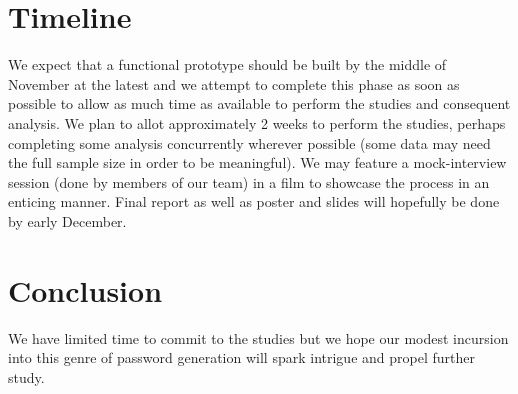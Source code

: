 \documentclass[conference]{IEEEtran}
\begin{document}
\section{Timeline}
We expect that a functional prototype should be built by the middle of November at the latest and we attempt to complete this phase as soon as possible to allow as much time as available to perform the studies and consequent analysis. We plan to allot approximately 2 weeks to perform the studies, perhaps completing some analysis concurrently wherever possible (some data may need the full sample size in order to be meaningful). We may feature a mock-interview session (done by members of our team) in a film to showcase the process in an enticing manner. Final report as well as poster and slides will hopefully be done by early December. 

\section{Conclusion}
We have limited time to commit to the studies but we hope our modest incursion into this genre of password generation will spark intrigue and propel further study.


\end{document}
